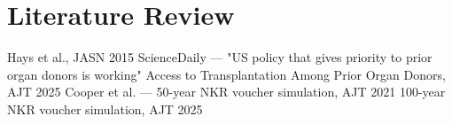 \section{Literature Review}
\label{sec:lit}
Hays et al., JASN 2015
ScienceDaily — "US policy that gives priority to prior organ donors is working"
Access to Transplantation Among Prior Organ Donors, AJT 2025
Cooper et al. — 50-year NKR voucher simulation, AJT 2021
100-year NKR voucher simulation, AJT 2025